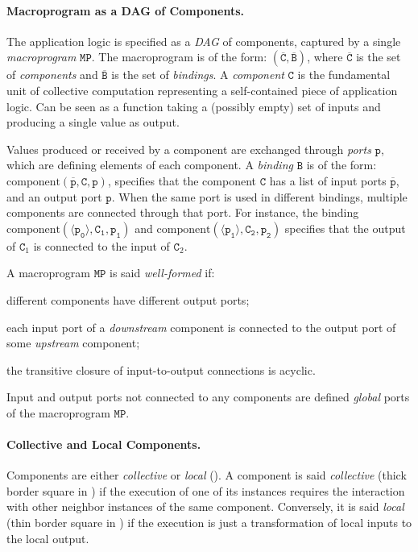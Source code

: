 \paragraph{Macroprogram as a DAG of Components.}
The application logic is specified as a \emph{\gls{DAG}} of components,
 captured by a single \emph{macroprogram} $\mathtt{MP}$.
%
The macroprogram is of the form: $(\mathtt{\overline{C}}, \mathtt{\overline{B}})$,
 where $\mathtt{\overline{C}}$ is the set of \emph{components} 
 and $\mathtt{\overline{B}}$ is the set of \emph{bindings}.
%
A \emph{component} $\mathtt{C}$ is the fundamental unit of collective computation 
 representing a self-contained piece of application logic.
%
Can be seen as a function taking a (possibly empty) set of inputs 
 and producing a single value as output.

Values produced or received by a component are exchanged through \emph{ports} $\mathtt{p}$,
 which are defining elements of each component.
%
A \emph{binding} $\mathtt{B}$ is of the form: $\text{component}(\overline{\mathtt{p}}, \mathtt{C}, \mathtt{p})$,
 specifies that the component $\mathtt{C}$ has a list of input ports $\overline{\mathtt{p}}$, 
 and an output port $\mathtt{p}$.
%
When the same port is used in different bindings,
 multiple components are connected through that port.
%
For instance,
 the binding $\text{component}(\langle \mathtt{p_0} \rangle, \mathtt{C_1}, \mathtt{p_1})$
 and $\text{component}(\langle \mathtt{p_1} \rangle, \mathtt{C_2}, \mathtt{p_2})$
 specifies that the output of $\mathtt{C}_1$ is connected to the input of $\mathtt{C}_2$.

A macroprogram $\mathtt{MP}$ is said \emph{well-formed} if:
\begin{enumerate*}[label=(\roman*)]
  \item different components have different output ports;
  \item each input port of a \emph{downstream} component is connected to the output port of some \emph{upstream} component;
  \item the transitive closure of input-to-output connections is acyclic.
\end{enumerate*}
%
Input and output ports not connected to any components 
 are defined \emph{global} ports of the macroprogram $\mathtt{MP}$.

\paragraph{Collective and Local Components.}
Components are either \emph{collective} 
 or \emph{local} ().
%
A component is said \emph{collective} (thick border square in ) 
 if the execution of one of its instances requires the interaction 
 with other neighbor instances of the same component.
%
Conversely,
 it is said \emph{local} (thin border square in ) 
 if the execution is just a transformation of local inputs to the local output.

